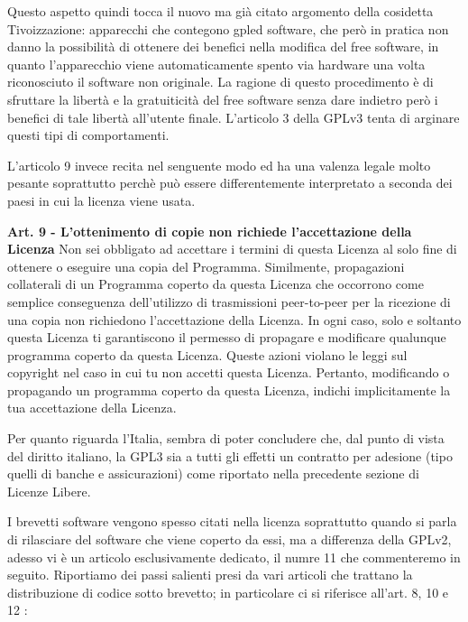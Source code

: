 Questo aspetto quindi tocca il nuovo ma già citato argomento della cosidetta Tivoizzazione: apparecchi che contegono gpled software, che però in pratica non danno la possibilità di ottenere dei benefici nella modifica del free software, in quanto l'apparecchio viene automaticamente spento via hardware una volta riconosciuto il software non originale. La ragione di questo procedimento è di sfruttare la libertà e la gratuiticità del free software senza dare indietro però i benefici di tale libertà all'utente finale. L'articolo 3 della GPLv3 tenta di arginare questi tipi di comportamenti.

L'articolo 9 invece recita nel senguente modo ed ha una valenza legale molto pesante soprattutto perchè può essere differentemente interpretato a seconda dei paesi in cui la licenza viene usata.\\


\begin{scriptsize}\textbf{Art. 9 - L'ottenimento di copie non richiede l'accettazione della Licenza}
Non sei obbligato ad accettare i termini di questa Licenza al solo fine di ottenere o eseguire una copia del Programma. Similmente, propagazioni collaterali di un Programma coperto da questa Licenza che occorrono come semplice conseguenza dell'utilizzo di trasmissioni peer-to-peer per la ricezione di una copia non richiedono l'accettazione della Licenza. In ogni caso, solo e soltanto questa Licenza ti garantiscono il permesso di propagare e modificare qualunque programma coperto da questa Licenza. Queste azioni violano le leggi sul copyright nel caso in cui tu non accetti questa Licenza. Pertanto, modificando o propagando un programma coperto da questa Licenza, indichi implicitamente la tua accettazione della Licenza.\\

\end{scriptsize}

Per quanto riguarda l'Italia, sembra di poter concludere che, dal punto di vista del diritto italiano, la GPL3 sia a tutti gli effetti un contratto per adesione (tipo quelli di banche e assicurazioni) come riportato nella precedente sezione di Licenze Libere.

I brevetti software vengono spesso citati nella licenza soprattutto quando si parla di rilasciare del software che viene coperto da essi, ma a differenza della GPLv2, adesso vi è un articolo esclusivamente dedicato, il numre 11 che commenteremo in seguito. Riportiamo dei passi salienti presi da vari articoli che trattano la distribuzione di codice sotto brevetto; in particolare ci si riferisce all'art. 8, 10 e 12 :\\



